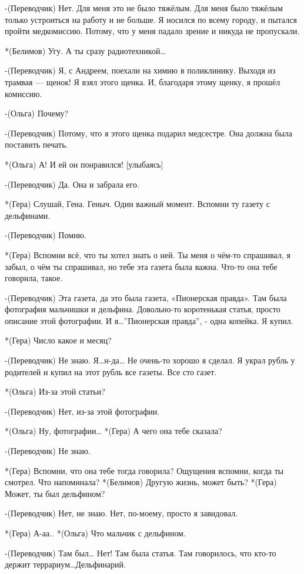 -(Переводчик) Нет. Для меня это не было тяжёлым. Для меня было тяжёлым только устроиться на работу и не больше. Я носился по всему городу, и пытался пройти медкомиссию. Потому, что у меня падало зрение и никуда не пропускали.

*(Белимов) Угу. А ты сразу радиотехникой…

-(Переводчик) Я, с Андреем, поехали на химию в поликлинику. Выходя из трамвая — щенок! Я взял этого щенка. И, благодаря этому щенку, я прошёл комиссию.

-(Ольга) Почему?

-(Переводчик) Потому, что я этого щенка подарил медсестре. Она должна была поставить печать.

*(Ольга) А! И ей он понравился! [улыбаясь]

-(Переводчик) Да. Она и забрала его.

*(Гера) Слушай, Гена. Геныч. Один важный момент. Вспомни ту газету с дельфинами. 

-(Переводчик) Помню.

*(Гера) Вспомни всё, что ты хотел знать о ней. Ты меня о чём-то спрашивал, я забыл, о чём ты спрашивал, но тебе эта газета была важна. Что-то она тебе говорила, такое.

-(Переводчик) Эта газета, да это была газета, «Пионерская правда». Там была фотография мальчишки и дельфина. Довольно-то коротенькая статья, просто описание этой фотографии. И я…”Пионерская правда”, - одна копейка. Я купил.

*(Гера) Число какое и месяц?

-(Переводчик) Не знаю. Я…н-да…  Не очень-то хорошо я сделал. Я украл рубль у родителей и купил на этот рубль все газеты. Все сто газет.

*(Ольга) Из-за этой статьи?

-(Переводчик) Нет, из-за этой фотографии.

*(Ольга) Ну, фотографии…
*(Гера) А чего она тебе сказала?

-(Переводчик) Не знаю.

*(Гера) Вспомни, что она тебе тогда говорила? Ощущения вспомни, когда ты смотрел. Что напоминала?
*(Белимов) Другую жизнь, может быть?
*(Гера) Может, ты был дельфином?

-(Переводчик) Нет, не знаю. Нет, по-моему,  просто я завидовал.

*(Гера) А-аа..
*(Ольга) Что мальчик с дельфином.

-(Переводчик) Там был… Нет! Там была статья. Там говорилось, что кто-то держит террариум…Дельфинарий. 

